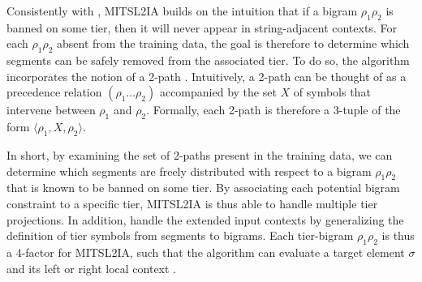 \documentclass[11pt]{article}
\begin{document}
Consistently with \citep{McMullinSCIL2019}, MITSL2IA builds on the intuition that  if a bigram $\rho_1\rho_2$ is banned on some tier, then it will never appear in string-adjacent contexts. 
For each $\rho_1\rho_2$ absent from the training data, the goal is therefore to determine which segments
can be safely removed from the associated tier. To do so, the algorithm incorporates the
notion of a 2-path \citep{JardineHeinz16}.
 Intuitively, a 2-path can be thought of as a
precedence relation $(\rho_1 \dots \rho_2 )$ accompanied by the set $X$ of symbols that intervene between $\rho_1$ and $\rho_2$.
 Formally, each 2-path is therefore a 3-tuple of the form $\langle \rho_1, X, \rho_2 \rangle$. 

In short, by examining the set of 2-paths present in the training data, we can determine
which segments are freely distributed with respect to a bigram $\rho_1\rho_2$ that is known to be
banned on some tier. 
By associating each potential bigram constraint to a specific tier, MITSL2IA is thus able to handle multiple tier projections.
In addition, \citet{de2021learning} handle the extended input contexts by generalizing the definition of tier symbols from segments to bigrams.\@
Each tier-bigram $\rho_1\rho_2$ is thus a 4-factor for MITSL2IA, such that the algorithm can evaluate a target element $\sigma$ and its left or right local context \citep[see][for technical details]{de2021learning}.
%
\end{document}
